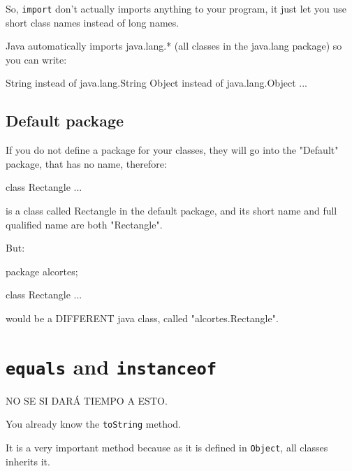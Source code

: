 \documentclass[a4paper, 9pt]{extarticle}
\begin{document}
So, \texttt{import} don't actually imports anything to your program, it just
let you use short class names instead of long names.

Java automatically imports java.lang.* (all classes in the java.lang package)
so you can write:

\begin{blackboard}
String instead of java.lang.String
Object instead of java.lang.Object
...
\end{blackboard}







\subsection{Default package}

If you do not define a package for your classes, they will go into the
"Default" package, that has no name, therefore:

\begin{blackboard}
class Rectangle {
  ...
}
\end{blackboard}

is a class called Rectangle in the default package, and its short name and full
qualified name are both "Rectangle".

But:

\begin{blackboard}
package alcortes;

class Rectangle {
...
}
\end{blackboard}

would be a DIFFERENT java class, called "alcortes.Rectangle".




















\section{\texttt{equals} and \texttt{instanceof}}

NO SE SI DARÁ TIEMPO A ESTO.


You already know the \texttt{toString} method.

It is a very important method because as it is defined in \texttt{Object}, all
classes inherits it.
\end{document}
